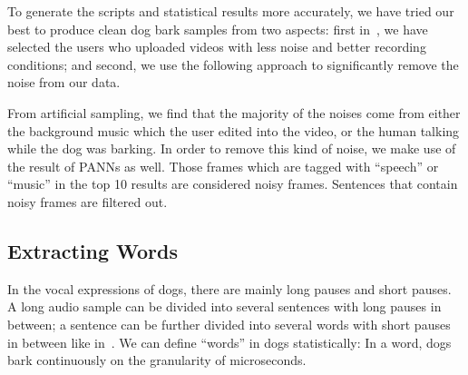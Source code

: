 To generate the scripts and statistical results more accurately, we have tried our best to produce clean dog bark samples from two aspects: first in~, we have selected the users who uploaded videos with less noise and better recording conditions; 
and second, we use the following approach to significantly remove the noise from our data.
 
From artificial sampling, we find that the majority of the noises come from either the background music which the user edited into the video, or the human talking while the dog was barking. In order to remove this kind of noise, we make use of the result of PANNs as well. Those frames which are tagged with ``speech'' or ``music'' in the top 10 results are considered noisy frames. Sentences that contain noisy frames are filtered out. 




 \subsection{Extracting Words}

In the vocal expressions of dogs, there are mainly long pauses and short pauses. A long audio sample can be divided into several sentences with long pauses in between; a sentence can be further divided into several words with short pauses in between like in~. We can define ``words'' in dogs statistically: In a word, dogs bark continuously on the granularity of microseconds.




